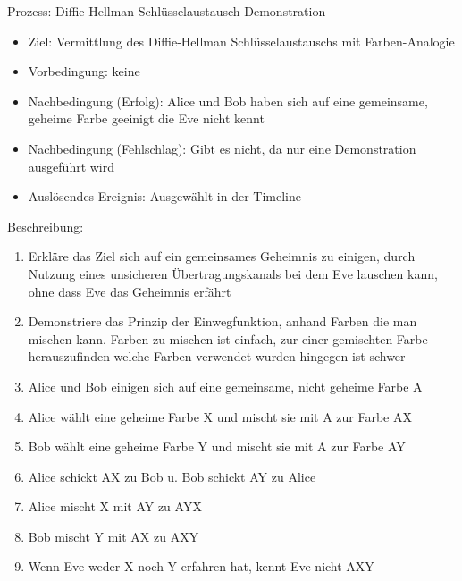 \documentclass{article}
\begin{document}
\begin{FA}[start=100]
\item Prozess: Diffie-Hellman Schlüsselaustausch Demonstration
\end{FA}
\begin{itemize}[label={}]
    \item Ziel: Vermittlung des Diffie-Hellman Schlüsselaustauschs mit Farben-Analogie
    \item Vorbedingung: keine
    \item Nachbedingung (Erfolg): Alice und Bob haben sich auf eine
        gemeinsame, geheime Farbe geeinigt die Eve nicht kennt
    \item Nachbedingung (Fehlschlag): Gibt es nicht, da nur
        eine Demonstration ausgeführt wird
    \item Auslösendes Ereignis: Ausgewählt in der Timeline
\end{itemize}

Beschreibung:
\begin{enumerate}
    \item Erkläre das Ziel sich auf ein gemeinsames Geheimnis zu einigen,
        durch Nutzung eines unsicheren Übertragungskanals
        bei dem Eve lauschen kann, ohne dass Eve das Geheimnis erfährt
    \item Demonstriere das Prinzip der Einwegfunktion, anhand Farben die man mischen
        kann. Farben zu mischen ist einfach, zur einer gemischten Farbe
        herauszufinden welche Farben verwendet wurden hingegen ist schwer
    \item Alice und Bob einigen sich auf eine gemeinsame, nicht geheime Farbe A
    \item Alice wählt eine geheime Farbe X und mischt sie mit A zur Farbe AX
    \item Bob wählt eine geheime Farbe Y und mischt sie mit A zur Farbe AY
    \item Alice schickt AX zu Bob u. Bob schickt AY zu Alice
    \item Alice mischt X mit AY zu AYX
    \item Bob mischt Y mit AX zu AXY
    \item Wenn Eve weder X noch Y erfahren hat, kennt Eve nicht AXY
\end{enumerate}
\end{document}
